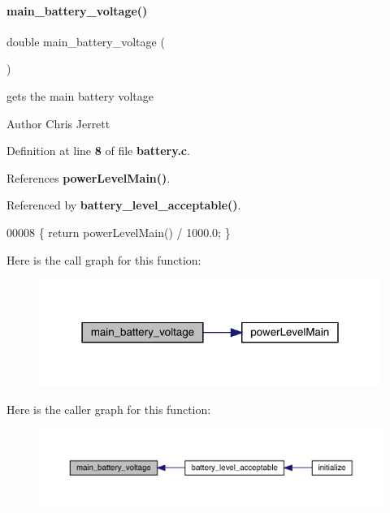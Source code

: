 \paragraph{main\+\_\+battery\+\_\+voltage()}
{\footnotesize\ttfamily double main\+\_\+battery\+\_\+voltage (\begin{DoxyParamCaption}{ }\end{DoxyParamCaption})}



gets the main battery voltage 

\begin{DoxyAuthor}{Author}
Chris Jerrett 
\end{DoxyAuthor}


Definition at line \textbf{ 8} of file \textbf{ battery.\+c}.



References \textbf{ power\+Level\+Main()}.



Referenced by \textbf{ battery\+\_\+level\+\_\+acceptable()}.


\begin{DoxyCode}
00008 \{ \textcolor{keywordflow}{return} powerLevelMain() / 1000.0; \}
\end{DoxyCode}
Here is the call graph for this function\+:
\nopagebreak
\begin{figure}[H]
\begin{center}
\leavevmode
\includegraphics[width=316pt]{battery_8c_a8c92c389534fdb079698cdebeb7f2efa_cgraph}
\end{center}
\end{figure}
Here is the caller graph for this function\+:
\nopagebreak
\begin{figure}[H]
\begin{center}
\leavevmode
\includegraphics[width=350pt]{battery_8c_a8c92c389534fdb079698cdebeb7f2efa_icgraph}
\end{center}
\end{figure}

